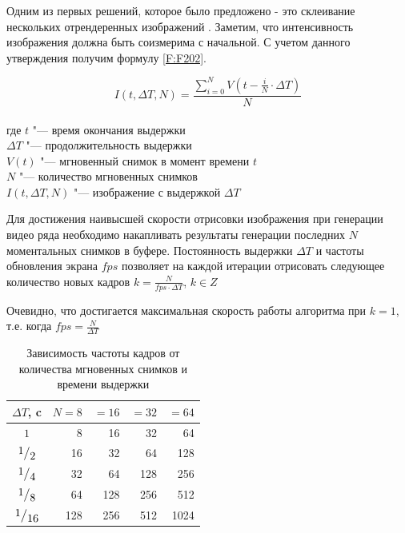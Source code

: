 Одним из первых решений, которое было предложено - это склеивание нескольких отрендеренных изображений   \cite{Haeberli90}. Заметим, что интенсивность изображения должна быть соизмерима с начальной. С учетом данного утверждения получим формулу \eqref{F:F202}.
\begin{eqndesc}
    \begin{equation}\label{F:F202}
        I(t, \Delta T, N) = \frac{ \sum_{i=0}^{N} { V({t - \frac{i}{N} \cdot \Delta T})}}{N}
    \end{equation}
    \\
    где $t$ "--- время окончания выдержки \\
    $\Delta T$ "--- продолжительность выдержки \\
    $V(t)$ "--- мгновенный снимок в момент времени $t$\\
    $N$ "--- количество мгновенных снимков \\
    $I(t, \Delta T, N)$ "--- изображение с выдержкой $\Delta T$
\end{eqndesc}

Для достижения наивысшей скорости отрисовки изображения при генерации видео ряда необходимо накапливать результаты генерации последних $N$ моментальных снимков в буфере. Постоянность выдержки $\Delta T$ и частоты обновления экрана $fps$  позволяет на каждой итерации отрисовать следующее количество новых кадров  $k = \frac{N}{fps \cdot \Delta T}$, $k \in Z$
\par
Очевидно, что достигается максимальная скорость работы алгоритма при $k = 1$, т.е. когда $fps = \frac{N}{\Delta T}$


\begin{table}[ht]
    \caption{Зависимость частоты кадров от количества мгновенных снимков и времени выдержки}
    \begin{tabular}{|c|r|r|r|r|}
        \hline
        $\Delta T$, c & $N =8$ & $=16$ & $=32$ & $=64$ \\
        \hline
        $1$           & 8      & 16    & 32    & 64    \\
        $\frc{1}{2}$  & 16     & 32    & 64    & 128   \\
        $\frc{1}{4}$  & 32     & 64    & 128   & 256   \\
        $\frc{1}{8}$  & 64     & 128   & 256   & 512   \\
        $\frc{1}{16}$ & 128    & 256   & 512   & 1024  \\
        \hline
    \end{tabular}
    \label{tab:acum_table}
\end{table}


